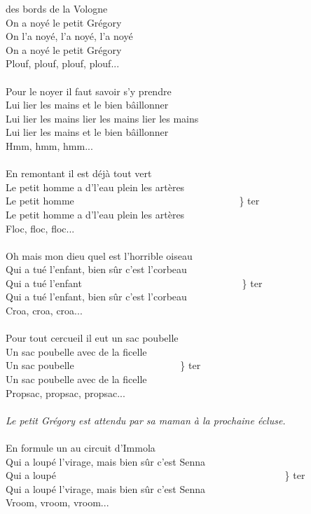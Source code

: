 
 des bords de la Vologne
\\On a noyé le petit Grégory
\\On l'a noyé, l'a noyé, l'a noyé
\\On a noyé le petit Grégory
\\Plouf, plouf, plouf, plouf...
\\\\Pour le noyer il faut savoir s'y prendre
\\Lui lier les mains et le bien bâillonner
\\Lui lier les mains lier les mains lier les mains
\\Lui lier les mains et le bien bâillonner
\\Hmm, hmm, hmm...
\\\\En remontant il est déjà tout vert
\\Le petit homme a d'l'eau plein les artères
\\Le petit homme ~~~~~~~~~~~~~~~~~~~~~~~~~~~~~~~~~\} ter
\\Le petit homme a d'l'eau plein les artères
\\Floc, floc, floc...
\\\\Oh mais mon dieu quel est l'horrible oiseau
\\Qui a tué l'enfant, bien sûr c'est l'corbeau
\\Qui a tué l'enfant ~~~~~~~~~~~~~~~~~~~~~~~~~~~~~~~~\} ter
\\Qui a tué l'enfant, bien sûr c'est l'corbeau
\\Croa, croa, croa...
\\\\Pour tout cercueil il eut un sac poubelle
\\Un sac poubelle avec de la ficelle
\\Un sac poubelle ~~~~~~~~~~~~~~~~~~~~~\} ter
\\Un sac poubelle avec de la ficelle
\\Propsac, propsac, propsac...
\\\\\textit{Le petit Grégory est attendu par sa maman à la prochaine écluse.}
\\\\En formule un au circuit d'Immola
\\Qui a loupé l'virage, mais bien sûr c'est Senna
\\Qui a loupé ~~~~~~~~~~~~~~~~~~~~~~~~~~~~~~~~~~~~~~~~~~~~~~\} ter
\\Qui a loupé l'virage, mais bien sûr c'est Senna
\\Vroom, vroom, vroom...

\breakpage